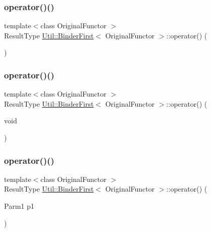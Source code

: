 \subsubsection{\texorpdfstring{operator()()}{operator()()}\hspace{0.1cm}{\footnotesize\ttfamily [1/10]}}
{\footnotesize\ttfamily template$<$class Original\+Functor $>$ \\
Result\+Type \mbox{\hyperlink{classUtil_1_1BinderFirst}{Util\+::\+Binder\+First}}$<$ Original\+Functor $>$\+::operator() (\begin{DoxyParamCaption}{ }\end{DoxyParamCaption})\hspace{0.3cm}{\ttfamily [inline]}}

\mbox{\label{classUtil_1_1BinderFirst_aaf3277caca5fced7454825a2f2920847}} 
\subsubsection{\texorpdfstring{operator()()}{operator()()}\hspace{0.1cm}{\footnotesize\ttfamily [2/10]}}
{\footnotesize\ttfamily template$<$class Original\+Functor $>$ \\
Result\+Type \mbox{\hyperlink{classUtil_1_1BinderFirst}{Util\+::\+Binder\+First}}$<$ Original\+Functor $>$\+::operator() (\begin{DoxyParamCaption}\item[{void}]{ }\end{DoxyParamCaption})\hspace{0.3cm}{\ttfamily [inline]}}

\mbox{\label{classUtil_1_1BinderFirst_abaf2000002a79a24771bbf52ef7e960c}} 
\subsubsection{\texorpdfstring{operator()()}{operator()()}\hspace{0.1cm}{\footnotesize\ttfamily [3/10]}}
{\footnotesize\ttfamily template$<$class Original\+Functor $>$ \\
Result\+Type \mbox{\hyperlink{classUtil_1_1BinderFirst}{Util\+::\+Binder\+First}}$<$ Original\+Functor $>$\+::operator() (\begin{DoxyParamCaption}\item[{Parm1}]{p1 }\end{DoxyParamCaption})\hspace{0.3cm}{\ttfamily [inline]}}

